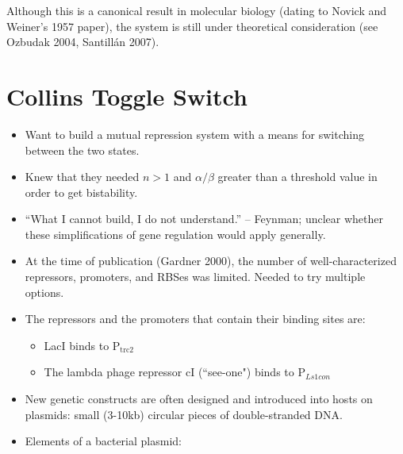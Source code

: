 \documentclass{article}
\begin{document}
Although this is a canonical result in molecular biology (dating to Novick and Weiner's 1957 paper), the system is still under theoretical consideration (see Ozbudak 2004, Santill\'{a}n 2007).\\

\section*{Collins Toggle Switch}

\begin{itemize}

\item Want to build a mutual repression system with a means for switching between the two states.

\item Knew that they needed $n>1$ and $\alpha/\beta$ greater than a threshold value in order to get bistability.

\item ``What I cannot build, I do not understand.'' -- Feynman; unclear whether these simplifications of gene regulation would apply generally.

\item At the time of publication (Gardner 2000), the number of well-characterized repressors, promoters, and RBSes was limited. Needed to try multiple options.

\item The repressors and the promoters that contain their binding sites are:
\begin{itemize}
\item LacI binds to P$_{\textrm{trc2}}$
\item The lambda phage repressor cI (``see-one") binds to P$_{Ls1con}$ 
\end{itemize}

\item New genetic constructs are often designed and introduced into hosts on plasmids: small (3-10kb) circular pieces of double-stranded DNA.

\item Elements of a bacterial plasmid:


\end{itemize}
\end{document}
